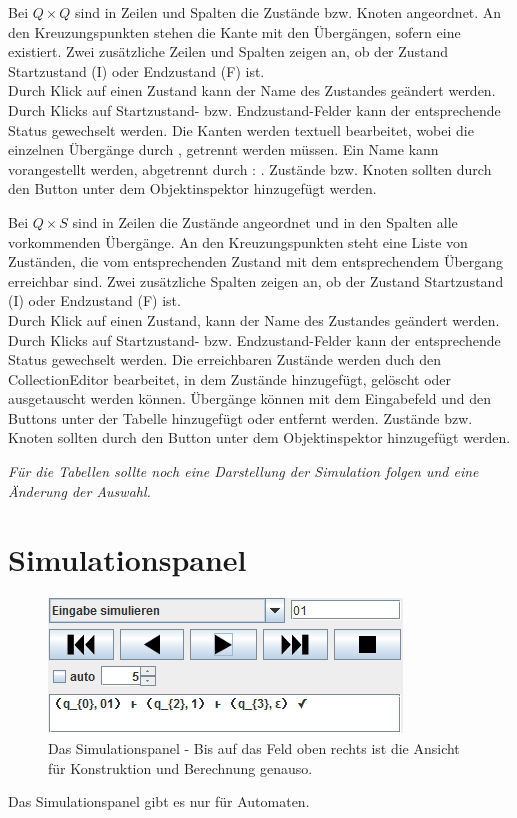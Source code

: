 Bei $Q \times Q$ sind in Zeilen und Spalten die Zustände bzw. Knoten angeordnet. An den Kreuzungspunkten stehen die Kante mit den Übergängen, sofern eine existiert. Zwei zusätzliche Zeilen und Spalten zeigen an, ob der Zustand Startzustand (I) oder Endzustand (F) ist.\\
Durch Klick auf einen Zustand kann der Name des Zustandes geändert werden. Durch Klicks auf Startzustand- bzw. Endzustand-Felder kann der entsprechende Status gewechselt werden. Die Kanten werden textuell bearbeitet, wobei die einzelnen Übergänge durch \glqq , \grqq getrennt werden müssen. Ein Name kann vorangestellt werden, abgetrennt durch \glqq : \grqq . Zustände bzw. Knoten sollten durch den Button unter dem Objektinspektor hinzugefügt werden.

Bei $Q \times S$ sind in Zeilen die Zustände angeordnet und in den Spalten alle vorkommenden Übergänge. An den Kreuzungspunkten steht eine Liste von Zuständen, die vom entsprechenden Zustand mit dem entsprechendem Übergang erreichbar sind. Zwei zusätzliche Spalten zeigen an, ob der Zustand Startzustand (I) oder Endzustand (F) ist.\\
Durch Klick auf einen Zustand, kann der Name des Zustandes geändert werden. Durch Klicks auf Startzustand- bzw. Endzustand-Felder kann der entsprechende Status gewechselt werden. Die erreichbaren Zustände werden duch den Collection\-Editor bearbeitet, in dem Zustände hinzugefügt, gelöscht oder ausgetauscht werden können. Übergänge können mit dem Eingabefeld und den Buttons unter der Tabelle hinzugefügt oder entfernt werden. Zustände bzw. Knoten sollten durch den Button unter dem Objektinspektor hinzugefügt werden.

\textit{Für die Tabellen sollte noch eine Darstellung der Simulation folgen und eine Änderung der Auswahl.}
\section{Simulationspanel}
\begin{figure}[htbp]
\centering
\includegraphics{pic/screenshots/simpanel}%
\caption{Das Simulationspanel - Bis auf das Feld oben rechts ist die Ansicht für Konstruktion und Berechnung genauso.}%
\end{figure}
Das Simulationspanel gibt es nur für Automaten.

